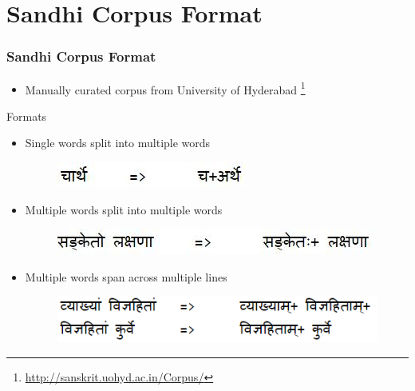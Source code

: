 \documentclass[xcolor=dvipsnames]{beamer}
\begin{document}
\section{Sandhi Corpus Format}
\begin{frame}
\frametitle{Sandhi Corpus Format}
\begin{itemize}
\item Manually curated corpus from University of Hyderabad \footnote{\url{http://sanskrit.uohyd.ac.in/Corpus/}} 
\end{itemize}
Formats\
\begin{itemize}
\item Single words split into multiple words
\begin{figure}
	\includegraphics[scale=0.5]{img/singleword.png} 
 \end{figure}
\item Multiple words split into multiple words
\begin{figure}
	\includegraphics[scale=0.5]{img/multiword.png} 
 \end{figure}
\item Multiple words span across multiple lines
\begin{figure}
	\includegraphics[scale=0.5]{img/multiline.png} 
 \end{figure}
\end{itemize}
\end{frame}

\end{document}
